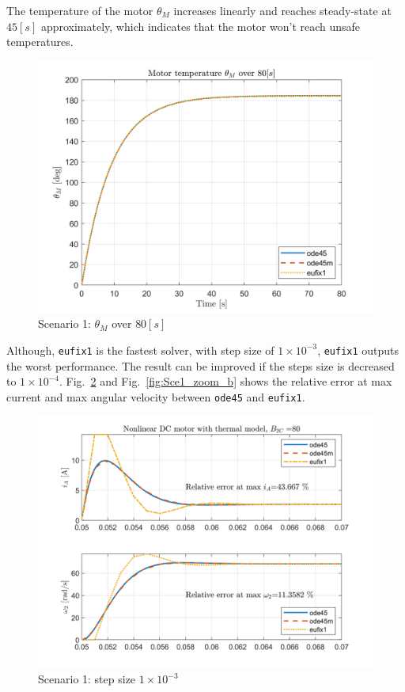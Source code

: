 \documentclass[]{article}
\newcommand{\figref}[1]{Fig.~\ref{#1}}
\begin{document}
The temperature of the motor $\theta_M$ increases linearly and reaches steady-state at $45[s]$ approximately, which indicates that the motor won't reach unsafe temperatures.
\begin{figure}[H]
	\centering
	\includegraphics[width=0.65\linewidth]{thetaM_ode45-ode45m-eufix1_1e-3}
	\caption{Scenario 1: $\theta_M$ over $80[s]$}
	\label{fig:Sce1_thetaM}
\end{figure}

Although, \texttt{eufix1} is the fastest solver, with step size of $1\times 10^{-3}$, \texttt{eufix1} outputs the worst performance. The result can be improved if the steps size is decreased to $1\times 10^{-4}$. \figref{fig:Sce1_zoom_a} and \figref{fig:Sce1_zoom_b} shows the relative error at max current and max angular velocity between \texttt{ode45} and \texttt{eufix1}.

\begin{figure}[H]
	\centering
	\includegraphics[width=0.80\linewidth]{E0_ode45-ode45m-eufix1_1e-3_zoom}
	\caption{Scenario 1: step size $1\times 10^{-3}$}
	\label{fig:Sce1_zoom_a}
\end{figure}
\end{document}
